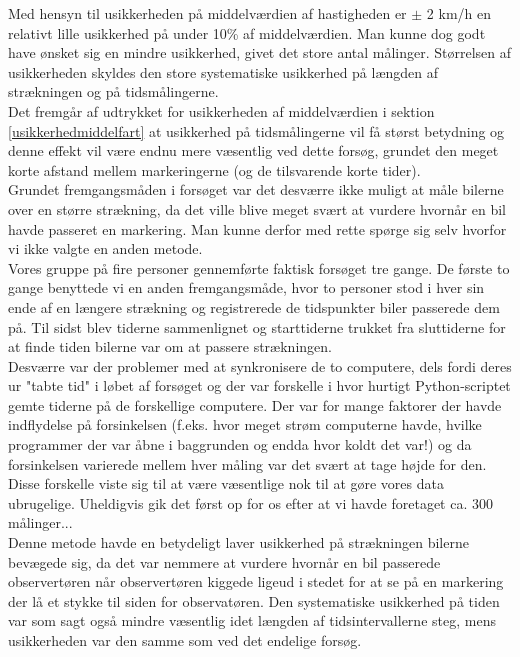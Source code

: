\documentclass[hidelinks]{article}
\begin{document}
Med hensyn til usikkerheden på middelværdien af hastigheden er $\pm$ 2 km/h en relativt lille usikkerhed på under 10\% af middelværdien. Man kunne dog godt have ønsket sig en mindre usikkerhed, givet det store antal målinger. Størrelsen af usikkerheden skyldes den store systematiske usikkerhed på længden af strækningen og på tidsmålingerne. \\

Det fremgår af udtrykket for usikkerheden af middelværdien i sektion \ref{usikkerhedmiddelfart} at usikkerhed på tidsmålingerne vil få størst betydning og denne effekt vil være endnu mere væsentlig ved dette forsøg, grundet den meget korte afstand mellem markeringerne (og de tilsvarende korte tider).\\

Grundet fremgangsmåden i forsøget var det desværre ikke muligt at måle bilerne over en større strækning, da det ville blive meget svært at vurdere hvornår en bil havde passeret en markering. Man kunne derfor med rette spørge sig selv hvorfor vi ikke valgte en anden metode.\\

Vores gruppe på fire personer gennemførte faktisk forsøget tre gange. De første to gange benyttede vi en anden fremgangsmåde, hvor to personer stod i hver sin ende af en længere strækning og registrerede de tidspunkter biler passerede dem på. Til sidst blev tiderne sammenlignet og starttiderne trukket fra sluttiderne for at finde tiden bilerne var om at passere strækningen.\\

Desværre var der problemer med at synkronisere de to computere, dels fordi deres ur "tabte tid" i løbet af forsøget og der var forskelle i hvor hurtigt Python-scriptet gemte tiderne på de forskellige computere. Der var for mange faktorer der havde indflydelse på forsinkelsen (f.eks. hvor meget strøm computerne havde, hvilke programmer der var åbne i baggrunden og endda hvor koldt det var!) og da forsinkelsen varierede mellem hver måling var det svært at tage højde for den.\\

Disse forskelle viste sig til at være væsentlige nok til at gøre vores data ubrugelige. Uheldigvis gik det først op for os efter at vi havde foretaget ca. 300 målinger...\\

Denne metode havde en betydeligt laver usikkerhed på strækningen bilerne bevægede sig, da det var nemmere at vurdere hvornår en bil passerede observertøren når observertøren kiggede ligeud i stedet for at se på en markering der lå et stykke til siden for observatøren. Den systematiske usikkerhed på tiden var som sagt også mindre væsentlig idet længden af tidsintervallerne steg, mens usikkerheden var den samme som ved det endelige forsøg.\\
\end{document}
